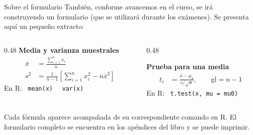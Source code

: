 \documentclass[aspectratio=169,10pt]{beamer}
\newcommand{\Rc}[1]{{\setlength{\fboxsep}{1.6pt}%
  \colorbox{codigoFondo}{\textcolor{codigoTexto}{\texttt{#1}}}}}
\newcommand{\destaca}[1]{%
  \par\vspace{3pt}\noindent
  \colorbox{azulClaro}{%
    \parbox{\dimexpr\linewidth-2\fboxsep\relax}{\vspace{3pt}#1\vspace{3pt}}}%
  \par\vspace{3pt}}
\begin{document}
\begin{frame}{Sobre el formulario}
  También, conforme avancemos en el curso, se irá construyendo un formulario (que se utilizará durante los exámenes). Se presenta aquí un pequeño extracto:
  \vspace{0.3cm}
    \begin{columns}[T]
    \begin{column}{0.48\textwidth}
      {\footnotesize \textbf{Media y varianza muestrales}}
      \vspace{-0.15cm}
      \begin{align*}
        \bar{x} &= \frac{\sum_{i=1}^{n} x_i}{n} \\[4pt]
        s^2 &= \frac{1}{n-1}\left[\sum_{i=1}^{n} x_i^2 - n\bar{x}^2\right]
      \end{align*}
      {\color{grisT}\small En R:}~\Rc{mean(x)}~~\Rc{var(x)}
    \end{column}
    \begin{column}{0.48\textwidth}
      \raggedright
      {\footnotesize \textbf{Prueba para una media}}
      \vspace{-0.15cm}
      \begin{align*}
        t_c &= \frac{\bar{x} - \mu_0}{s/\sqrt{n}}, \qquad \text{gl} = n-1
      \end{align*}
      {\color{grisT}\small En R:}~\Rc{t.test(x, mu = mu0)}
    \end{column}
  \end{columns}
  \vspace{0.4cm}
      \destaca{ Cada fórmula aparece acompañada de su correspondiente comando en R. El formulario completo se encuentra en los apéndices del libro y se puede imprimir.}
\end{frame}
\end{document}
